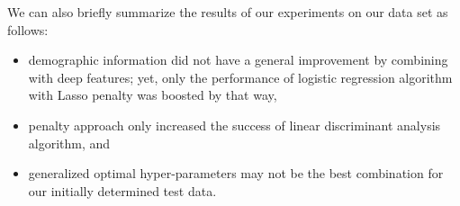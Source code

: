 We can also briefly summarize the results of our experiments on our data set as follows:
\begin{itemize}
	\item demographic information did not have a general improvement by combining with deep features; yet, only the performance of logistic regression algorithm with Lasso penalty was boosted by that way,
	\item penalty approach only increased the success of linear discriminant analysis algorithm, and
	\item generalized optimal hyper-parameters may not be the best combination for our initially determined test data.
\end{itemize}

